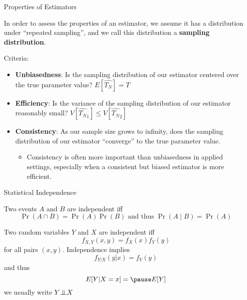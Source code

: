 \documentclass{beamer}
\numberwithin{equation}{section}
\newcommand{\indep}{{\bot\negthickspace\negthickspace\bot}}
\begin{document}
\begin{frame}{Properties of Estimators}

In order to assess the properties of an estimator, we assume it has a
distribution under ``repeated sampling'', and we call this distribution
a \textbf{sampling distribution}.

\bigskip

Criteria:

\pause

\begin{itemize}
\itemsep1pt\parskip0pt
\item
  \textbf{Unbiasedness}: Is the sampling distribution of our estimator
  centered over the true parameter value? $E[\hat{T_N}]=T$\\ \pause
\item
  \textbf{Efficiency}: Is the variance of the sampling distribution of
  our estimator reasonably small? $V[\hat{T_N}_1]\leq V[\hat{T_N}_2]$
  \pause
\item
  \textbf{Consistency}: As our sample size grows to infinity, does the
  sampling distribution of our estimator ``converge'' to the true
  parameter value.

  \begin{itemize}
  \itemsep1pt\parskip0pt
  \item
    Consistency is often more important than unbiasedness in applied
    settings, especially when a consistent but biased estimator is more
    efficient.
  \end{itemize}
\end{itemize}

\end{frame}

\begin{frame}{Statistical Independence}

\begin{Definition}
\begin{small}
Two events $A$ and $B$ are independent iff \pause $$\Pr(A \cap B)=\Pr(A)\Pr(B) \mbox{ and thus } \Pr(A\mid B)=\Pr(A)$$
\end{small}
\end{Definition}

\begin{Definition}
\begin{small}
Two random variables $Y$ and $X$ are independent iff \pause  $$f_{X,Y}(x,y) = f_X(x)f_Y(y)$$ for all pairs $(x,y)$. Independence implies $$f_{Y|X}(y|x)=f_{Y}(y)$$ and thus$$
E[Y|X=x]=\pause E[Y]
$$ we usually write $Y \indep X$
\end{small}
\end{Definition}

\end{frame}
\end{document}
